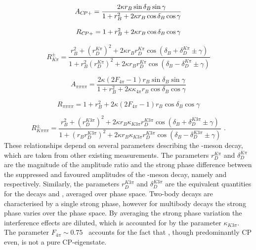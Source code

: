 \begin{equation}
A_{{C\!P}+} = \frac{2 \kappa r_B\sin\delta_B\sin\gamma}{1 + r_B^2 + 2 \kappa r_B\cos\delta_B\cos\gamma}
\label{exp_Acp}
\end{equation}

\begin{equation}
R_{{C\!P}+} = 1 + r_B^2 + 2 \kappa r_B\cos\delta_B\cos\gamma
\label{exp_Rcp}
\end{equation}

\begin{equation}
R^{\pm}_{K\pi} = \frac{r_B^2 + \left(r_D^{K\pi}\right)^2 + 2\kappa r_B r_D^{K\pi} \cos(\delta_B + \delta_D^{K\pi} \pm \gamma)}{1 + r_B^2\left(r_D^{K\pi}\right)^2 + 2\kappa r_B r_D^{K\pi} \cos(\delta_B - \delta_D^{K\pi} \pm \gamma)}
\label{exp_Rpm}
\end{equation}

\begin{equation}
A_{\pi\pi\pi\pi} = \frac{2 \kappa\left(2F_{4\pi} - 1\right) r_B\sin\delta_B\sin\gamma}{1 + r_B^2 + 2 \kappa\kappa_{4\pi} r_B\cos\delta_B\cos\gamma}
\label{exp_A4pi}
\end{equation}

\begin{equation}
R_{\pi\pi\pi\pi} = 1 + r_B^2 + 2 \kappa\left(2F_{4\pi} - 1\right) r_B\cos\delta_B\cos\gamma
\label{exp_R4pi}
\end{equation}

\begin{equation}
R^{\pm}_{K\pi\pi\pi} = \frac{r_B^2 + \left(r_D^{K3\pi}\right)^2 + 2\kappa r_B \kappa_{K3\pi} r_D^{K3\pi} \cos(\delta_B + \delta_D^{K3\pi} \pm \gamma)}{1 + \left(r_Br_D^{K3\pi}\right)^2 + 2\kappa r_B \kappa_{K3\pi} r_D^{K3\pi} \cos(\delta_B - \delta_D^{K3\pi} \pm \gamma)} \text{ .}
\label{exp_Rpm4body}
\end{equation}
These relationships depend on several parameters describing the \D-meson decay, which are taken from other existing measurements. The parameters $r_D^{K\pi}$ and $\delta_D^{K\pi}$ are the magnitude of the amplitude ratio and the strong phase difference between the suppressed and favoured amplitudes of the \D-meson decay, namely \decay{\Dz}{\Kp\pim} and \decay{\Dz}{\Km\pip} respectively. Similarly, the parameters $r_D^{K3\pi}$ and $\delta_D^{K3\pi}$ are the equivalent quantities for the decays \decay{\Dz}{\Kp\pim\pip\pim} and \decay{\Dz}{\Km\pip\pim\pip}, averaged over phase space. Two-body \decay{\D}{\Kmp\pipm} decays are characterised by a single strong phase, however for multibody \decay{\D}{\Kmp\pipm\pimp\pipm} decays the strong phase varies over the phase space. By averaging the strong phase variation the interference effects are diluted, which is accounted for by the parameter $\kappa_{K3\pi}$. The parameter $F_{4\pi} \sim 0.75$~\cite{charm4pi} accounts for the fact that \decay{\D}{\pip\pim\pip\pim}, though predominantly CP even, is not a pure CP-eigenstate.



